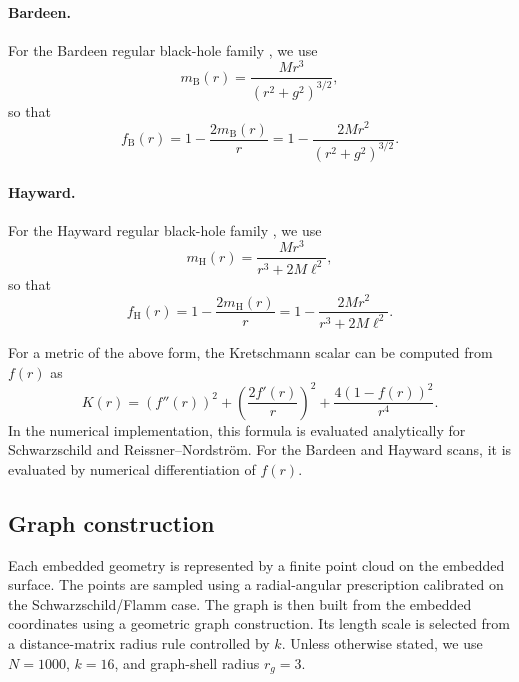 \documentclass[11pt,a4paper]{article}
\begin{document}
\paragraph{Bardeen.}
For the Bardeen regular black-hole family \cite{Bardeen1968}, we use
\begin{equation}
    m_{\mathrm{B}}(r)
    =
    \frac{Mr^3}{(r^2+g^2)^{3/2}},
\end{equation}
so that
\begin{equation}
    f_{\mathrm{B}}(r)
    =
    1-\frac{2m_{\mathrm{B}}(r)}{r}
    =
    1-\frac{2Mr^2}{(r^2+g^2)^{3/2}}.
\end{equation}

\paragraph{Hayward.}
For the Hayward regular black-hole family \cite{Hayward2006}, we use
\begin{equation}
    m_{\mathrm{H}}(r)
    =
    \frac{Mr^3}{r^3+2M\ell^2},
\end{equation}
so that
\begin{equation}
    f_{\mathrm{H}}(r)
    =
    1-\frac{2m_{\mathrm{H}}(r)}{r}
    =
    1-\frac{2Mr^2}{r^3+2M\ell^2}.
\end{equation}

For a metric of the above form, the Kretschmann scalar can be computed from $f(r)$ as
\begin{equation}
    K(r)
    =
    \left(f''(r)\right)^2
    +
    \left(\frac{2f'(r)}{r}\right)^2
    +
    \frac{4(1-f(r))^2}{r^4}.
    \label{eq:kfromf}
\end{equation}
In the numerical implementation, this formula is evaluated analytically for Schwarzschild and Reissner--Nordstr\"om. For the Bardeen and Hayward scans, it is evaluated by numerical differentiation of $f(r)$.

\subsection{Graph construction}

Each embedded geometry is represented by a finite point cloud on the embedded surface. The points are sampled using a radial-angular prescription calibrated on the Schwarzschild/Flamm case. The graph is then built from the embedded coordinates using a geometric graph construction. Its length scale is selected from a distance-matrix radius rule controlled by $k$. Unless otherwise stated, we use $N=1000$, $k=16$, and graph-shell radius $r_g=3$.
\end{document}
